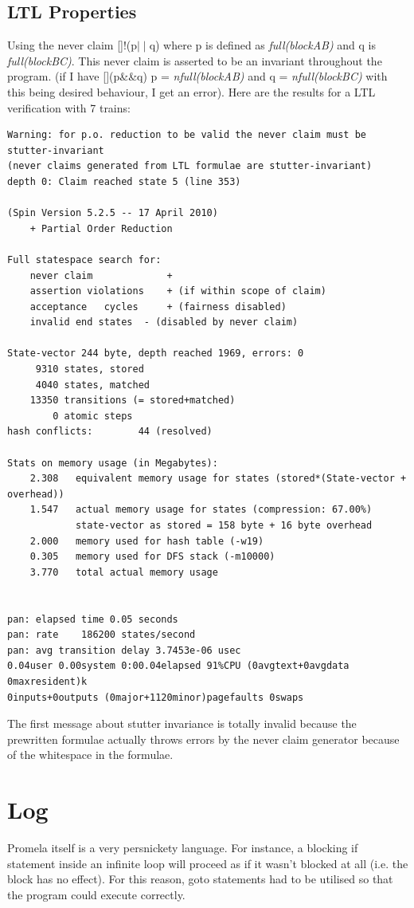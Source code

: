 \documentclass[10pt]{article}
\begin{document}
    \subsection{LTL Properties}
      Using the never claim []!(p$\mid\mid$q) where p is defined as \emph{
      full(blockAB)} and q is \emph{full(blockBC)}. This never claim is
      asserted to be an invariant throughout the program.
      (if I have [](p\&\&q) p = \emph{nfull(blockAB)} and q =
      \emph{nfull(blockBC)} with this being desired behaviour, I get an
      error).
      Here are the results for a LTL verification with 7 trains:
      \begin{verbatim}
Warning: for p.o. reduction to be valid the never claim must be stutter-invariant
(never claims generated from LTL formulae are stutter-invariant)
depth 0: Claim reached state 5 (line 353)

(Spin Version 5.2.5 -- 17 April 2010)
	+ Partial Order Reduction

Full statespace search for:
	never claim         	+
	assertion violations	+ (if within scope of claim)
	acceptance   cycles 	+ (fairness disabled)
	invalid end states	- (disabled by never claim)

State-vector 244 byte, depth reached 1969, errors: 0
     9310 states, stored
     4040 states, matched
    13350 transitions (= stored+matched)
        0 atomic steps
hash conflicts:        44 (resolved)

Stats on memory usage (in Megabytes):
    2.308	equivalent memory usage for states (stored*(State-vector + overhead))
    1.547	actual memory usage for states (compression: 67.00%)
         	state-vector as stored = 158 byte + 16 byte overhead
    2.000	memory used for hash table (-w19)
    0.305	memory used for DFS stack (-m10000)
    3.770	total actual memory usage


pan: elapsed time 0.05 seconds
pan: rate    186200 states/second
pan: avg transition delay 3.7453e-06 usec
0.04user 0.00system 0:00.04elapsed 91%CPU (0avgtext+0avgdata 0maxresident)k
0inputs+0outputs (0major+1120minor)pagefaults 0swaps
      \end{verbatim}
      
      The first message about stutter invariance is totally invalid because
      the prewritten formulae actually throws errors by the never claim
      generator because of the whitespace in the formulae.   

  \section{Log}
    Promela itself is a very persnickety language. For instance, a blocking
    if statement inside an infinite loop will proceed as if it wasn't blocked
    at all (i.e. the block has no effect). For this reason, goto statements
    had to be utilised so that the program could execute correctly.
\end{document}
